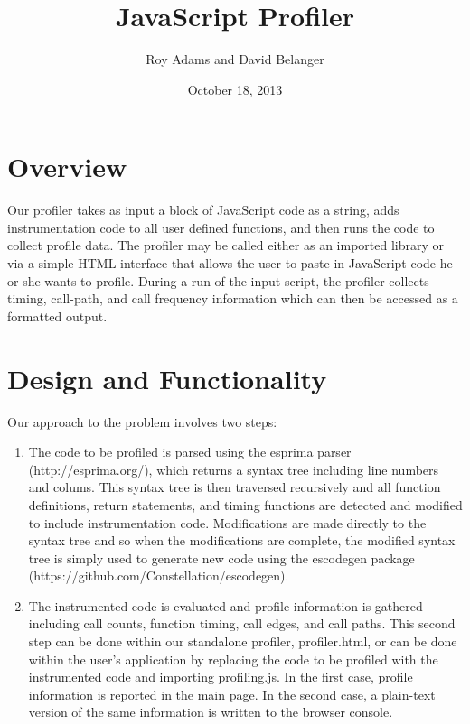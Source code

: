 \documentclass[11pt]{article}
\begin{document}
\newenvironment{myindentpar}[1]%
{\begin{list}{}%
         {\setlength{\leftmargin}{#1}}%
         \item[]%
}
{\end{list}}

\title{JavaScript Profiler}
\date{October 18, 2013}
\author{Roy Adams and David Belanger}

\maketitle

\section{Overview}

	Our profiler takes as input a block of JavaScript code as a string, adds instrumentation code 
to all user defined functions, and then runs the code to collect profile data. The profiler may 
be called either as an imported library or via a simple HTML interface that allows the user to 
paste in JavaScript code he or she wants to profile. During a run of the input script, the profiler 
collects timing, call-path, and call frequency information which can then be accessed as a formatted output. 

\section{Design and Functionality}
	
Our approach to the problem involves two steps:
\begin{enumerate}
\item  The code to be profiled is parsed using the 
esprima parser (http://esprima.org/), which returns a syntax tree including line numbers and colums. This 
syntax tree is then traversed recursively and all function definitions, return statements, and timing 
functions are detected and modified to include instrumentation code. Modifications 
are made directly to the syntax tree and so when the modifications are complete, the modified syntax 
tree is simply used to generate new code using the escodegen package \\(https://github.com/Constellation/escodegen).
\item The instrumented code is evaluated and profile information is gathered including call counts, function timing, call edges, and call paths. This second step can be done within our standalone profiler, 
profiler.html, or can be done within the user's application by replacing the code to be profiled 
with the instrumented code and importing profiling.js. In the first case, profile information is 
reported in the main page. In the second case, a plain-text version of
the same information is written to the browser console.
\end{enumerate}
\end{document}
